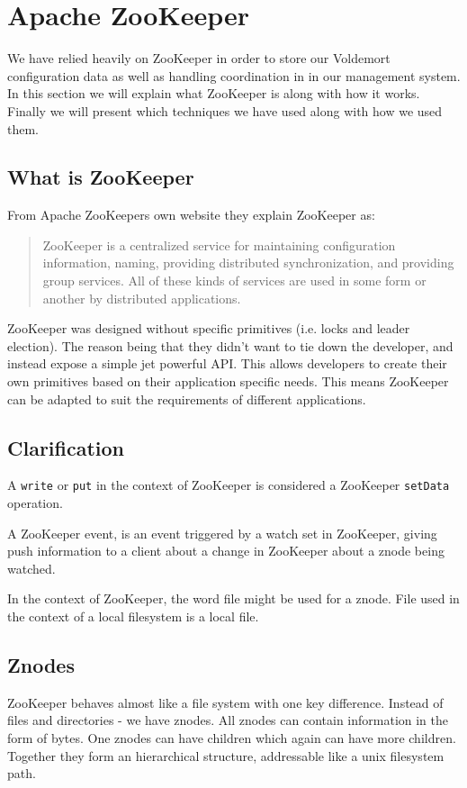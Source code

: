 \clearpage
\section{Apache ZooKeeper}
\label{sec:zookeeper}
We have relied heavily on ZooKeeper in order to store our Voldemort configuration data as well as handling coordination in in our management system. In this section we will explain what ZooKeeper is along with how it works. Finally we will present which techniques we have used along with how we used them. 

\subsection{What is ZooKeeper}
From Apache ZooKeepers own website\cite{zookeeper} they explain ZooKeeper as:

\blockquote{ZooKeeper is a centralized service for maintaining configuration information, naming, providing distributed synchronization, and providing group services. All of these kinds of services are used in some form or another by distributed applications.}

ZooKeeper was designed without specific primitives (i.e. locks and leader election). The reason being that they didn't want to tie down the developer, and instead expose a simple jet powerful API. This allows developers to create their own primitives based on their application specific needs. This means ZooKeeper can be adapted to suit the requirements of different applications. 

\subsection{Clarification}
A \texttt{write} or \texttt{put} in the context of ZooKeeper is considered a ZooKeeper \texttt{setData} operation.

A ZooKeeper event, is an event triggered by a watch set in ZooKeeper, giving push information to a client about a change in ZooKeeper about a znode being watched.

In the context of ZooKeeper, the word file might be used for a znode. File used in the context of a local filesystem is a local file.

\subsection{Znodes}
ZooKeeper behaves almost like a file system with one key difference. Instead of files and directories - we have znodes. All znodes can contain information in the form of bytes. One znodes can have children which again can have more children. Together they form an hierarchical structure, addressable like a unix filesystem path. 

